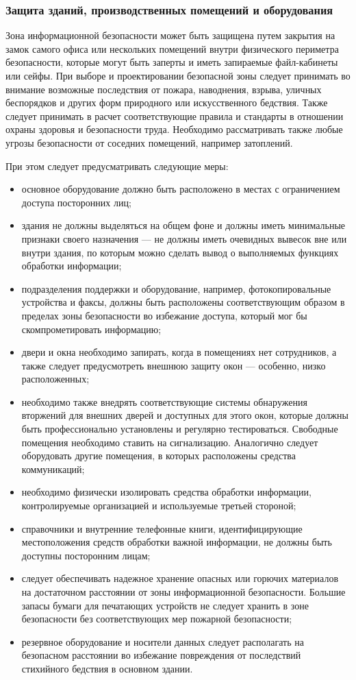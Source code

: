 \documentclass[12pt, russian, oneside, article]{ncc}
\begin{document}
\subsubsection{Защита зданий, производственных помещений и оборудования}
\label{sec-5_5_2}


Зона информационной безопасности может быть защищена путем закрытия на замок самого офиса или нескольких помещений внутри физического периметра безопасности, которые могут быть заперты и иметь запираемые файл-кабинеты или сейфы. При выборе и проектировании безопасной зоны следует принимать во внимание возможные последствия от пожара, наводнения, взрыва, уличных беспорядков и других форм природного или искусственного бедствия. Также следует принимать в расчет соответствующие правила и стандарты в отношении охраны здоровья и безопасности труда. Необходимо рассматривать также любые угрозы безопасности от соседних помещений, например затоплений.

При этом следует предусматривать следующие меры:
\begin{itemize}
\item основное оборудование должно быть расположено в местах с ограничением доступа посторонних лиц;
\item здания не должны выделяться на общем фоне и должны иметь минимальные признаки своего назначения --- не должны иметь очевидных вывесок вне или внутри здания, по которым можно сделать вывод о выполняемых функциях обработки информации;
\item подразделения поддержки и оборудование, например, фотокопировальные устройства и факсы, должны быть расположены соответствующим образом в пределах зоны безопасности во избежание доступа, который мог бы скомпрометировать информацию;
\item двери и окна необходимо запирать, когда в помещениях нет сотрудников, а также следует предусмотреть внешнюю защиту окон --- особенно, низко расположенных;
\item необходимо также внедрять соответствующие системы обнаружения вторжений для внешних дверей и доступных для этого окон, которые должны быть профессионально установлены и регулярно тестироваться. Свободные помещения необходимо ставить на сигнализацию. Аналогично следует оборудовать другие помещения, в которых расположены средства коммуникаций;
\item необходимо физически изолировать средства обработки информации, контролируемые организацией и используемые третьей стороной;
\item справочники и внутренние телефонные книги, идентифицирующие местоположения средств обработки важной информации, не должны быть доступны посторонним лицам;
\item следует обеспечивать надежное хранение опасных или горючих материалов на достаточном расстоянии от зоны информационной безопасности. Большие запасы бумаги для печатающих устройств не следует хранить в зоне безопасности без соответствующих мер пожарной безопасности;
\item резервное оборудование и носители данных следует располагать на безопасном расстоянии во избежание повреждения от последствий стихийного бедствия в основном здании.
\end{itemize}
\end{document}
